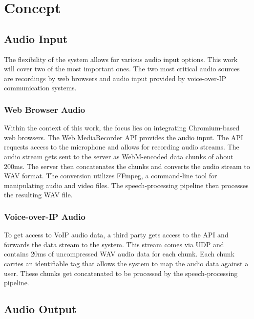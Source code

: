 \chapter{Concept}

\label{Chapter2}


\section{Audio Input}

The flexibility of the system allows for various audio input options. This work will cover two of the most important 
ones. The two most critical audio sources are recordings by web browsers and audio input provided by voice-over-IP 
communication systems.

\subsection{Web Browser Audio}

Within the context of this work, the focus lies on integrating Chromium-based web browsers. The Web MediaRecorder API 
provides the audio input. The API requests access to the microphone and allows for recording audio streams. 
The audio stream gets sent to the server as WebM-encoded data chunks of about 200ms. The server then concatenates the 
chunks and converts the audio stream to WAV format. The conversion utilizes FFmpeg, a command-line tool for 
manipulating audio and video files. The speech-processing pipeline then processes the resulting WAV file.

\subsection{Voice-over-IP Audio}

To get access to VoIP audio data, a third party gets access to the API and forwards the data stream to the system. 
This stream comes via UDP and contains 20ms of uncompressed WAV audio data for each chunk.
Each chunk carries an identifiable tag that allows the system to map the audio data against a user.
These chunks get concatenated to be processed by the speech-processing pipeline.


\section{Audio Output}


